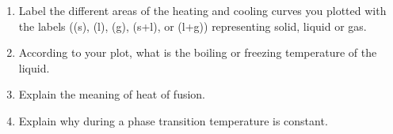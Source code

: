 \documentclass[main.tex]{subfiles}
\begin{document}
\begin{enumerate}
\item Label the different areas of the heating and cooling curves you plotted with the labels ((s), (l), (g), (s+l), or (l+g)) representing solid, liquid or gas.
\vspace{2.5cm}
\item  According to your plot, what is the boiling or freezing temperature of the liquid.
\vspace{2.5cm}
\item Explain the meaning of heat of fusion. 
\vspace{2.5cm}
\item Explain why during a phase transition temperature is constant. 
\vspace{2.5cm}
\end{enumerate}

\clearpage\mbox{}\clearpage
 
\end{document}
